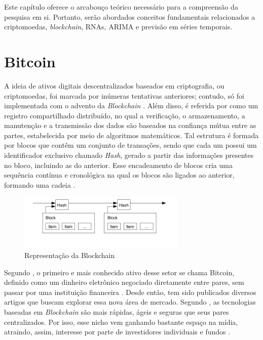 
Este capítulo oferece o arcabouço teórico necessário para a compreensão da pesquisa em si. 
Portanto, serão abordados conceitos fundamentais relacionados
a criptomoedas, \textit{blockchain}, RNAs, ARIMA e previsão em séries temporais.
\section{Bitcoin}
\label{secao:bitcoin}

A ideia de ativos digitais descentralizados baseados em criptografia, ou criptomoedas, foi marcada por inúmeras tentativas anteriores; contudo,
só foi implementada com o advento da \textit{Blockchain} \cite{Moi}. Além disso, é referida por \textcite{Yuan} como um registro compartilhado distribuído, no qual a verificação, o armazenamento, a manutenção e a transmissão dos dados são baseados na confiança mútua entre as partes, estabelecida por meio de algoritmos matemáticos.
Tal estrutura é formada por blocos que contêm um conjunto 
de transações, sendo que cada um possui um identificador exclusivo chamado \textit{Hash},
gerado a partir das informações presentes no bloco, incluindo as do anterior. 
Esse encadeamento de blocos cria uma sequência contínua e cronológica na qual os blocos são ligados ao anterior, formando uma cadeia \cite{Blockchain}.

\begin{figure}[!htb] \centering
  \caption{Representação da Blockchain} \label{figura:imageBlock}
  \begin{varwidth}{\linewidth}
    \includegraphics[width=8cm]{figuras/imageBlock.png}
  \end{varwidth}
\end{figure}

Segundo \textcite{Fer}, o primeiro e mais conhecido ativo desse setor se chama Bitcoin, definido como um dinheiro eletrônico negociado diretamente entre pares, sem passar por uma instituição financeira \cite{Nakamoto}.
Desde então, tem sido publicados diversos artigos que buscam explorar essa nova área de mercado. Segundo \textcite{Sousa}, as tecnologias baseadas em \textit{Blockchain} são mais rápidas, ágeis e seguras que seus pares centralizados. 
Por isso, esse nicho vem ganhando bastante espaço na mídia, atraindo, assim, interesse por parte de investidores individuais e fundos \cite{Yuan}. 

